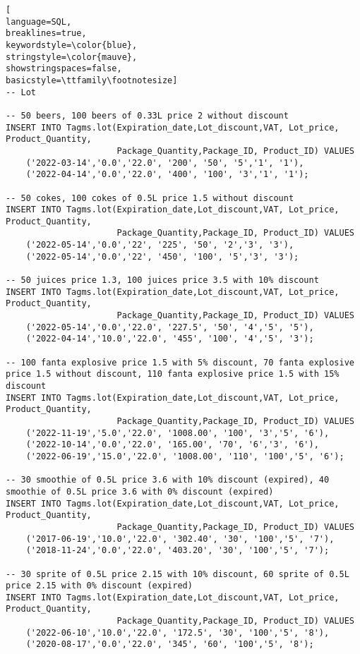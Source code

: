 \begin{lstlisting}[
language=SQL,
breaklines=true,
keywordstyle=\color{blue},
stringstyle=\color{mauve},
showstringspaces=false,
basicstyle=\ttfamily\footnotesize]
-- Lot

-- 50 beers, 100 beers of 0.33L price 2 without discount
INSERT INTO Tagms.lot(Expiration_date,Lot_discount,VAT, Lot_price, Product_Quantity,
                      Package_Quantity,Package_ID, Product_ID) VALUES
    ('2022-03-14','0.0','22.0', '200', '50', '5','1', '1'),
    ('2022-04-14','0.0','22.0', '400', '100', '3','1', '1');

-- 50 cokes, 100 cokes of 0.5L price 1.5 without discount
INSERT INTO Tagms.lot(Expiration_date,Lot_discount,VAT, Lot_price, Product_Quantity,
                      Package_Quantity,Package_ID, Product_ID) VALUES
    ('2022-05-14','0.0','22', '225', '50', '2','3', '3'),
    ('2022-05-14','0.0','22', '450', '100', '5','3', '3');

-- 50 juices price 1.3, 100 juices price 3.5 with 10% discount
INSERT INTO Tagms.lot(Expiration_date,Lot_discount,VAT, Lot_price, Product_Quantity,
                      Package_Quantity,Package_ID, Product_ID) VALUES
    ('2022-05-14','0.0','22.0', '227.5', '50', '4','5', '5'),
    ('2022-04-14','10.0','22.0', '455', '100', '4','5', '3');

-- 100 fanta explosive price 1.5 with 5% discount, 70 fanta explosive price 1.5 without discount, 110 fanta explosive price 1.5 with 15% discount
INSERT INTO Tagms.lot(Expiration_date,Lot_discount,VAT, Lot_price, Product_Quantity,
                      Package_Quantity,Package_ID, Product_ID) VALUES
    ('2022-11-19','5.0','22.0', '1008.00', '100', '3','5', '6'),
    ('2022-10-14','0.0','22.0', '165.00', '70', '6','3', '6'),
    ('2022-06-19','15.0','22.0', '1008.00', '110', '100','5', '6');

-- 30 smoothie of 0.5L price 3.6 with 10% discount (expired), 40 smoothie of 0.5L price 3.6 with 0% discount (expired)
INSERT INTO Tagms.lot(Expiration_date,Lot_discount,VAT, Lot_price, Product_Quantity,
                      Package_Quantity,Package_ID, Product_ID) VALUES
    ('2017-06-19','10.0','22.0', '302.40', '30', '100','5', '7'),
    ('2018-11-24','0.0','22.0', '403.20', '30', '100','5', '7');

-- 30 sprite of 0.5L price 2.15 with 10% discount, 60 sprite of 0.5L price 2.15 with 0% discount (expired)
INSERT INTO Tagms.lot(Expiration_date,Lot_discount,VAT, Lot_price, Product_Quantity,
                      Package_Quantity,Package_ID, Product_ID) VALUES
    ('2022-06-10','10.0','22.0', '172.5', '30', '100','5', '8'),
    ('2020-08-17','0.0','22.0', '345', '60', '100','5', '8');




\end{lstlisting}

